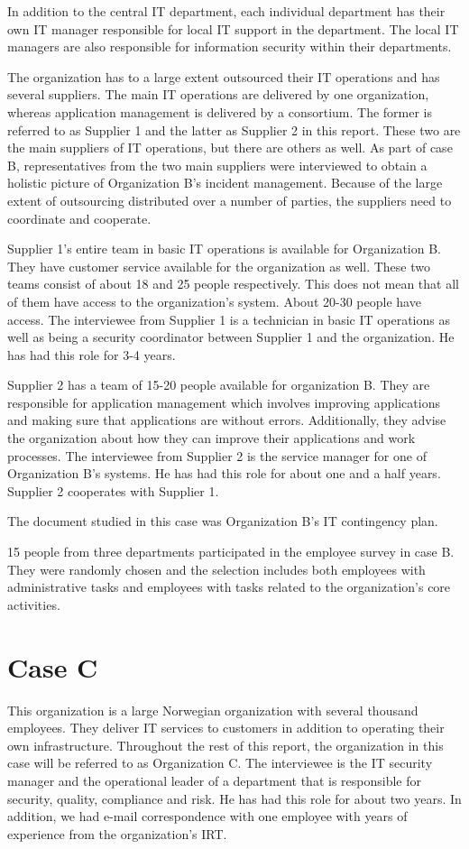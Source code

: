 In addition to the central IT department, %
each individual department has their own IT manager responsible for local IT support in the department. The local IT managers are also responsible for information security within their departments.

The organization has to a large extent outsourced their IT operations and has several suppliers. The main IT operations are delivered by one organization, whereas application management is delivered by a consortium. The former is referred to as Supplier 1 and the latter as Supplier 2 in this report. These two are the main suppliers of IT operations, but there are others as well. As part of case B, representatives from the two main suppliers were interviewed to obtain a holistic picture of Organization B's incident management. Because of the large extent of outsourcing distributed over a number of parties, the suppliers need to coordinate and cooperate. 

Supplier 1's entire team in basic IT operations is available for Organization B. They have customer service available for the organization as well. These two teams consist of about 18 and 25 people respectively. This does not mean that all of them have access to the organization's system. About 20-30 people have access. The interviewee from Supplier 1 is a technician in basic IT operations as well as being a security coordinator between Supplier 1 and the organization. He has had this role for 3-4 years.

Supplier 2 has a team of 15-20 people available for organization B. They are responsible for application management which involves improving applications and making sure that applications are without errors. Additionally, they advise the organization about how they can improve their applications and work processes. The interviewee from Supplier 2 is the service manager for one of Organization B's systems. He has had this role for about one and a half years. Supplier 2 cooperates with Supplier 1.

The document studied in this case was Organization B's IT contingency plan.

15 people from three departments participated in the employee survey in case B. They were randomly chosen and the selection includes both employees with administrative tasks and employees with tasks related to the organization's core activities.

\section{Case C}
This organization is a large Norwegian organization with several thousand employees. They deliver IT services to customers in addition to operating their own infrastructure. Throughout the rest of this report, the organization in this case will be referred to as Organization C. The interviewee is the IT security manager  and the operational leader of a department that is responsible for security, quality, compliance and risk. He has had this role for about two years. In addition, we had e-mail correspondence with one employee with years of experience from the organization's IRT.

